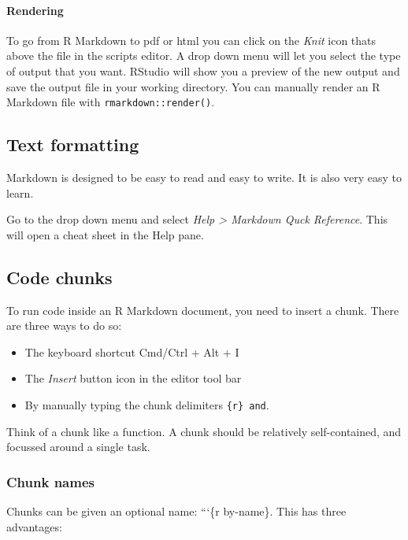 \documentclass[
]{article}
\begin{document}
\hypertarget{rendering}{%
\paragraph{Rendering}\label{rendering}}

To go from R Markdown to pdf or html you can click on the \emph{Knit}
icon thats above the file in the scripts editor. A drop down menu will
let you select the type of output that you want. RStudio will show you a
preview of the new output and save the output file in your working
directory. You can manually render an R Markdown file with
\texttt{rmarkdown::render()}.

\hypertarget{text-formatting}{%
\subsection{Text formatting}\label{text-formatting}}

Markdown is designed to be easy to read and easy to write. It is also
very easy to learn.

Go to the drop down menu and select \emph{Help \textgreater{} Markdown
Quck Reference}. This will open a cheat sheet in the Help pane.

\hypertarget{code-chunks}{%
\subsection{Code chunks}\label{code-chunks}}

To run code inside an R Markdown document, you need to insert a chunk.
There are three ways to do so:

\begin{itemize}
\item
  The keyboard shortcut Cmd/Ctrl + Alt + I
\item
  The \emph{Insert} button icon in the editor tool bar
\item
  By manually typing the chunk delimiters \texttt{\{r\}\ and}.
\end{itemize}

Think of a chunk like a function. A chunk should be relatively
self-contained, and focussed around a single task.

\hypertarget{chunk-names}{%
\subsubsection{Chunk names}\label{chunk-names}}

Chunks can be given an optional name: ```\{r by-name\}. This has three
advantages:
\end{document}
